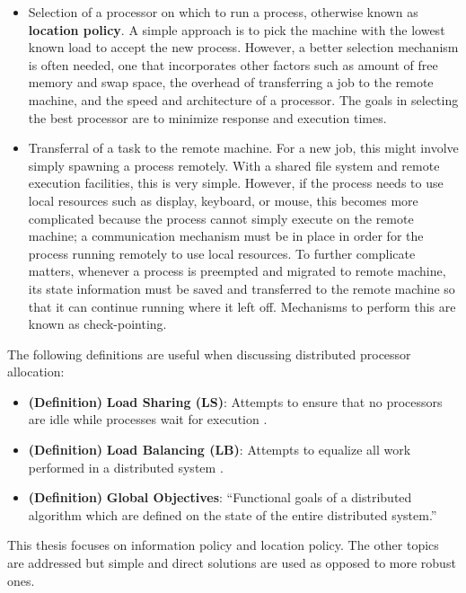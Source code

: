 \documentclass{report}
\newcommand{\definition}[3]{
	\textbf{(Definition)} \textbf{#1}: #2
	\label{#3}
}
\begin{document}
\begin{itemize}
	\item Selection of a processor on which to run a process, otherwise
	known as \textbf{location policy}.  A simple approach is to pick the
	machine with the lowest known load to accept the new process.
	However, a better selection mechanism is often needed, one that
	incorporates other factors such as amount of free memory and swap
	space, the overhead of transferring a job to the remote machine, and
	the speed and architecture of a processor.  The goals in selecting
	the best processor are to minimize response and execution times.

	\item Transferral of a task to the remote machine.  For a new job,
	this might involve simply spawning a process remotely.  With a
	shared file system and remote execution facilities, this is very
	simple.  However, if the process needs to use local resources such
	as display, keyboard, or mouse, this becomes more complicated
	because the process cannot simply execute on the remote machine; a
	communication mechanism must be in place in order for the process
	running remotely to use local resources.  To further complicate
	matters, whenever a process is preempted and migrated to remote
	machine, its state information must be saved and transferred to the
	remote machine so that it can continue running where it left off.
	Mechanisms to perform this are known as check-pointing.

\end{itemize}

The following definitions are useful when discussing distributed processor
allocation:

\begin{itemize}
	\item \definition{Load Sharing (LS)}{Attempts to ensure that
	no processors are idle while processes wait for execution
	\cite{preempt}.}{def:ls}

	\item \definition{Load Balancing (LB)}{Attempts to equalize all work
	performed in a distributed system \cite{preempt}.}{def:lb}

	\item \definition{Global Objectives}{``Functional goals of a
	distributed algorithm which are defined on the state of the entire
	distributed system.'' \cite{Casavant}}{def:global_obj}
\end{itemize}

This thesis focuses on information policy and location policy.  The other
topics are addressed but simple and direct solutions are used as opposed to
more robust ones.
\end{document}
